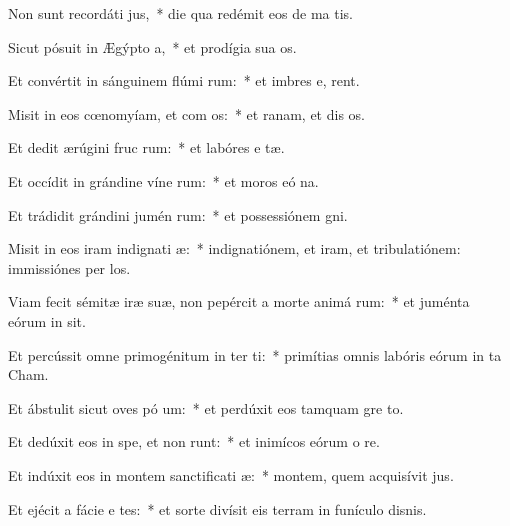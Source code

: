 \item Non sunt recordáti  jus,~* die qua redémit eos de ma tis.
\item Sicut pósuit in Ægýpto  a,~* et prodígia sua   os.
\item Et convértit in sánguinem flúmi rum:~* et imbres e,  rent.
\item Misit in eos cœnomyíam, et com os:~* et ranam, et dis os.
\item Et dedit ærúgini fruc rum:~* et labóres e tæ.
\item Et occídit in grándine víne rum:~* et moros eó  na.
\item Et trádidit grándini jumén rum:~* et possessiónem  gni.
\item Misit in eos iram indignati æ:~* indignatiónem, et iram, et tribulatiónem: immissiónes per  los.
\item Viam fecit sémitæ iræ suæ, non pepércit a morte animá rum:~* et juménta eórum in  sit.
\item Et percússit omne primogénitum in ter ti:~* primítias omnis labóris eórum in ta Cham.
\item Et ábstulit sicut oves pó um:~* et perdúxit eos tamquam gre  to.
\item Et dedúxit eos in spe, et non runt:~* et inimícos eórum o re.
\item Et indúxit eos in montem sanctificati æ:~* montem, quem acquisívit  jus.
\item Et ejécit a fácie e tes:~* et sorte divísit eis terram in funículo disnis.
